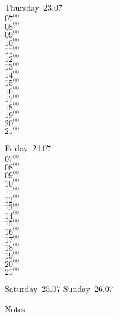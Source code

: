 \documentclass[11pt,a4paper]{book}\usepackage[]{graphicx}\usepackage[]{color}
\begin{document}
\clearpage
\begin{headerbox}
\end{headerbox}
\begin{weekdaybox}
  Thursday~23.07\\
  { 
  \vfill
  $07^{00}$\\
$08^{00}$\\
$09^{00}$\\
$10^{00}$\\
$11^{00}$\\
$12^{00}$\\
$13^{00}$\\
$14^{00}$\\
$15^{00}$\\
$16^{00}$\\
$17^{00}$\\
$18^{00}$\\
$19^{00}$\\
$20^{00}$\\
$21^{00}$\\
  }
\end{weekdaybox} 
\begin{weekdaybox}
  Friday~24.07\\
  { 
  \vfill
  $07^{00}$\\
$08^{00}$\\
$09^{00}$\\
$10^{00}$\\
$11^{00}$\\
$12^{00}$\\
$13^{00}$\\
$14^{00}$\\
$15^{00}$\\
$16^{00}$\\
$17^{00}$\\
$18^{00}$\\
$19^{00}$\\
$20^{00}$\\
$21^{00}$\\
  }
\end{weekdaybox}
\begin{weekendbox}
  Saturday~25.07
  \tcblower
  Sunday~26.07
\end{weekendbox} %
\begin{notebox}
  Notes
\end{notebox}
\clearpage
\end{document}
